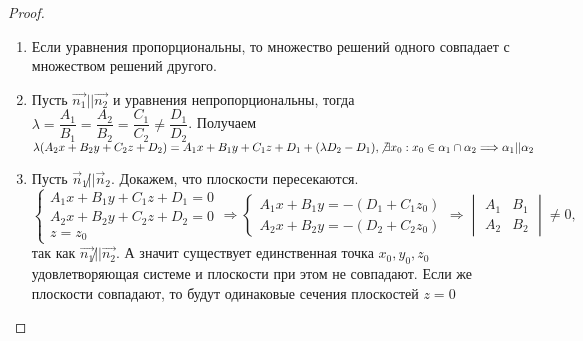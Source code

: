 \begin{proof}
	\begin{enumerate}
		\item Если уравнения пропорциональны, то множество решений одного совпадает с множеством решений другого.
		\item Пусть $\vec{n_1} || \vec{n_2}$ и уравнения непропорциональны, тогда \(\lambda = \dfrac{A_1}{B_1} = \dfrac{A_2}{B_2} = \dfrac{C_1}{C_2} \ne \dfrac{D_1}{D_2}\). Получаем \newline
		\(\lambda(A_2x+B_2y+C_2z+D_2) = A_1x+B_1y+C_1z+D_1 + (\lambda D_2 - D_1), \not\exists x_0: x_0\in \alpha_1\cap\alpha_2\Longrightarrow \alpha_1 || \alpha_2\)
		\item Пусть \(\vec n_1 \not || \vec n_2\). Докажем, что плоскости пересекаются. $\left\{
		\begin{gathered}
			A_1x+B_1y+C_1z+D_1 = 0 \\
			A_2x+B_2y+C_2z+D_2 = 0 \\ 
			z= z_0
		\end{gathered}
		\right.\Longrightarrow \left\{
		\begin{gathered}
			A_1x+B_1y = -(D_1 + C_1z_0) \\
			A_2x+B_2y = -(D_2 + C_2z_0)
		\end{gathered}
		\right.\Longrightarrow \begin{vmatrix}
			A_1 & B_1 \\
			A_2 & B_2
		\end{vmatrix}\ne 0,$ так как $\vec{n_1}\not||\vec{n_2}$. А значит существует единственная точка \(x_0, y_0, z_0\) удовлетворяющая системе и плоскости при этом не совпадают. Если же плоскости совпадают, то будут одинаковые сечения плоскостей \(z = 0\)
	\end{enumerate}
\end{proof}

